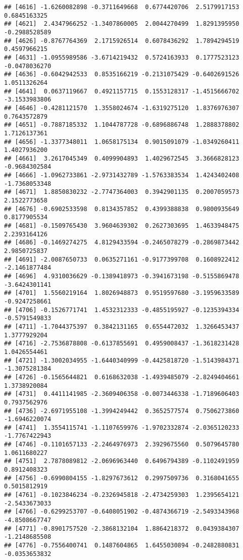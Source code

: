 \documentclass[
]{article}
\begin{document}
\begin{verbatim}
## [4616] -1.6260082898 -0.3711649668  0.6774420706  2.5179917153  0.6845163325
## [4621]  2.4347966252 -1.3407860005  2.0044270499  1.8291395950 -0.2988528589
## [4626] -0.8767764369  2.1715926514  0.6078436292  1.7894294519  0.4597966215
## [4631] -1.0955989586 -3.6714219432  0.5724163933  0.1777523123 -0.0478036270
## [4636] -0.6042942533  0.8535166219 -0.2131075429 -0.6402691526  1.0511326264
## [4641]  0.0637119667  0.4921157715  0.1553128317 -1.4515666702 -3.1533983806
## [4646] -0.4281121570  1.3558024674 -1.6319275120  1.8376976307  0.7643572879
## [4651] -0.7887185332  1.1044787728 -0.6896886748  1.2888378802  1.7126137361
## [4656] -1.3377348011  1.0658175134  0.9015091079 -1.0349260411  1.4027936200
## [4661]  3.2617045349  0.4099904893  1.4029672545  3.3666828123 -0.9684302584
## [4666] -1.0962733861 -2.9731432789 -1.5763383534  1.4243402408 -1.7368053348
## [4671]  1.8850830232 -2.7747364003  0.3942901135  0.2007059573  2.1522773658
## [4676] -0.6902533598  0.8134357852  0.4399388838  0.9800935649  0.8177905534
## [4681] -0.1509765430  3.9604639302  0.2627303695  1.4633948475  2.2393164126
## [4686] -0.1469274275  4.8129433594 -0.2465078279 -0.2869873442  2.9850725837
## [4691] -2.0087650733  0.0635271161 -0.9177399708  0.1608922412 -2.1461877484
## [4696]  4.9310036629 -0.1389418973 -0.3941673198 -0.5155869478 -3.6424301141
## [4701]  1.5560219164  1.8026948873  0.9519597680 -3.1959633589 -0.9247258661
## [4706] -0.1526771741  1.4532312333 -0.4855195927 -0.1235394334 -0.5791549833
## [4711] -1.7044375397  0.3842131165  0.6554472032  1.3266453437  1.3777929204
## [4716] -2.7536878808 -0.6137855691  0.4959008437 -1.3618231428  1.0426554461
## [4721] -1.3002034955 -1.6440340999 -0.4425818720 -1.5143984371 -1.3075281384
## [4726] -0.1565644821  0.6168632038 -1.4939485079 -2.8249404661  1.3738920084
## [4731]  0.4411141985 -2.3609406358 -0.0073446338 -1.7189606403  0.7937562976
## [4736] -2.6971955108 -1.3994249442  0.3652577574  0.7506273860 -1.6946220074
## [4741]  1.3554115741 -1.1107659976 -1.9702332874 -2.0365120233 -1.7767422943
## [4746] -0.1101657133 -2.2464976973  2.3929675560  0.5079645780  1.0611680227
## [4751]  2.7878089812 -2.0696963440  0.6496794389 -0.1102491959  0.8912408323
## [4756] -0.6990804155 -1.8297673612  0.2997509736  0.3168041655  0.5015812919
## [4761] -0.1023846234 -0.2326945818 -2.4734259303  1.2395654121 -2.5433673033
## [4766] -0.6299253707 -0.6408051902 -0.4874366719 -2.5493343968 -4.8508667747
## [4771] -0.8901757520 -2.3868132104  1.8864218372  0.0439384307 -1.2148685508
## [4776] -0.7556400741  0.1487604865  1.6455030894 -0.2482880831 -0.0353653832

\end{verbatim}
\end{document}
